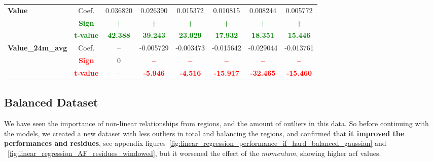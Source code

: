 \documentclass[11pt,english,a4paper,hidelinks]{book}
\begin{document}
\begin{table}[H]
\begin{tabular}{lccccccc}
        \midrule
        \multirow{3}{*}{\textbf{Value}}
            & Coef.   & 0.036820  & 0.026390  & 0.015372  & 0.010815  & 0.008244  & 0.005772  \\
            & \textbf{\textcolor{green}{Sign}}    & \textbf{\textcolor{green}{+}}         & \textbf{\textcolor{green}{+}}         & \textbf{\textcolor{green}{+}}         & \textbf{\textcolor{green}{+}}         & \textbf{\textcolor{green}{+}}         & \textbf{\textcolor{green}{+}}         \\
            & \textbf{\textcolor{green}{t-value}} & \textbf{\textcolor{green}{42.388}}    & \textbf{\textcolor{green}{39.243}}    & \textbf{\textcolor{green}{23.029}}    & \textbf{\textcolor{green}{17.932}}    & \textbf{\textcolor{green}{18.351}}    & \textbf{\textcolor{green}{15.446}}    \\
        \multirow{3}{*}{\textbf{Value\_24m\_avg}} 
            & Coef.   & -- & -0.005729 & -0.003473 & -0.015642 & -0.029044 & -0.013761 \\
            & \textbf{\textcolor{red}{Sign}}    & 0  & \textbf{\textcolor{red}{–}}         & \textbf{\textcolor{red}{–}}         & \textbf{\textcolor{red}{–}}         & \textbf{\textcolor{red}{–}}         & \textbf{\textcolor{red}{–}}         \\
            & \textbf{\textcolor{red}{t-value}} & -- & \textbf{\textcolor{red}{-5.946}}    & \textbf{\textcolor{red}{-4.516}}    & \textbf{\textcolor{red}{-15.917}}   & \textbf{\textcolor{red}{-32.465}}   & \textbf{\textcolor{red}{-15.460}}   \\
        \bottomrule
    \end{tabular}
    \label{tab:africa_middle_east_windowed_consistency_summary}
\end{table}

\subsection{Balanced Dataset}

We have seen the importance of non-linear relationships from regions, and the amount of outliers in this data. So before continuing with the models, we created a new dataset with less outliers in total and balancing the regions, and confirmed that \textbf{it improved the performances and residues}, see appendix figures~\ref{fig:linear_regression_performance_if_hard_balanced_gaussian} and ~\ref{fig:linear_regression_AF_residues_windowed}, but it worsened the effect of the \textit{momentum}, showing higher \acrshort{acf} values.
\end{document}
